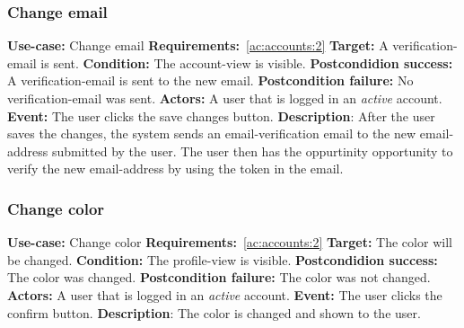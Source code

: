 \subsubsection{Change email}\label{subsubsec:change-email}
\textbf{Use-case:} Change email \newline
\textbf{Requirements:}~\ref{ac:accounts:2} \newline
\textbf{Target:} A verification-email is sent. \newline
\textbf{Condition:} The account-view is visible. \newline
\textbf{Postcondidion success:} A verification-email is sent to the new email. \newline
\textbf{Postcondition failure:} No verification-email was sent. \newline
\textbf{Actors:} A user that is logged in an \textit{active} account. \newline
\textbf{Event:} The user clicks the save changes button. \newline
\textbf{Description}: After the user saves the changes, the system sends an email-verification email to the new email-address submitted by the user.
The user then has the oppurtinity opportunity to verify the new email-address by using the token in the email.

\subsubsection{Change color}\label{subsubsec:change-color}
\textbf{Use-case:} Change color \newline
\textbf{Requirements:}~\ref{ac:accounts:2} \newline
\textbf{Target:} The color will be changed. \newline
\textbf{Condition:} The profile-view is visible. \newline
\textbf{Postcondidion success:} The color was changed. \newline
\textbf{Postcondition failure:} The color was not changed. \newline
\textbf{Actors:} A user that is logged in an \textit{active} account. \newline
\textbf{Event:} The user clicks the confirm button. \newline
\textbf{Description}: The color is changed and shown to the user.


